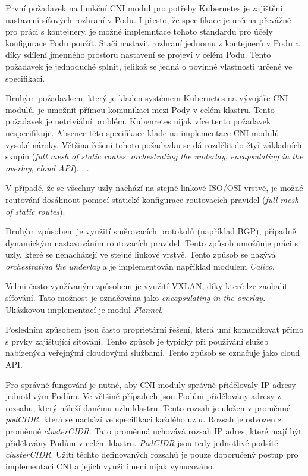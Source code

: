\bigskip

První požadavek na funkční CNI modul pro potřeby Kubernetes je zajištěni nastavení síťových rozhraní v Podu. I přesto, že specifikace je určena převážně pro práci s kontejnery, je možné implemntace tohoto standardu pro účely konfigurace Podu použít. Stačí nastavit rozhraní jednomu z kontejnerů v Podu a díky sdílení jmenného prostoru nastavení se projeví v celém Podu. Tento požadavek je jednoduché splnit, jelikož se jedná o povinné vlastnosti určené ve specifikaci.

\bigskip

Druhým požadavkem, který je kladen systémem Kubernetes na vývojáře CNI modulů, je umožnit přímou komunikaci mezi Pody v celém klastru. Tento požadavek je netriviální problém. Kubenretes nijak více tento požadavek nespecifikuje. Absence této specifikace klade na implementace CNI modulů vysoké nároky. Většina řešení tohoto požadavku se dá rozdělit do čtyř základních skupin (\textit{full mesh of static routes}, \textit{orchestrating the underlay}, \textit{encapsulating in the overlay}, \textit{cloud API}). \cite{kashin_2022_cni}, \cite{cncfcloudnativecomputingfoundation_2019_kubernetes}.

V případě, že se všechny uzly nachází na stejné linkové ISO/OSI vrstvě, je možné routování dosáhnout pomocí statické konfigurace routovacích pravidel (\textit{full mesh of static routes}).

Druhým způsobem je využití směrovacích protokolů (například BGP), případně dynamickým nastavováním routovacích pravidel. Tento způsob umožňuje práci s uzly, které se nenacházejí ve stejné linkové vrstvě. Tento způsob se nazývá \textit{orchestrating the underlay} a je implementován například modulem \textit{Calico}.

Velmi často využívaným způsobem je využití VXLAN, díky které lze zaobalit síťování. Tato možnost je označována jako \textit{encapsulating in the overlay}. Ukázkovou implementací je modul \textit{Flannel}.

Posledním způsobem jsou často proprietární řešení, která umí komunikovat přímo s prvky zajištující síťování. Tento způsob je typický při používání služeb nabízených veřejnými cloudovými službami. Tento způsob se označuje jako cloud API.

\bigskip

Pro správné fungování je nutné, aby CNI moduly správně přidělovaly IP adresy jednotlivým Podům. Ve většině případech jsou Podům přidělovány adresy z rozsahu, který náleží danému uzlu klastru. Tento rozsah je uložen v proměnné \textit{podCIDR}, která se nachází ve specifikaci každého uzlu. Rozsah je odvozen z proměnné \textit{clusterCIDR}. Tato proměnná uchovává rozsah IP adres, které mají být přidělovány Podům v celém klastru. \textit{PodCIDR} jsou tedy jednotlivé podsítě \textit{clusterCIDR}. Užití těchto definovaných rozsahů je pouze doporučený postup pro implementaci CNI a jejich využití není nijak vynucováno. \cite{cncfcloudnativecomputingfoundation_2019_kubernetes}       

